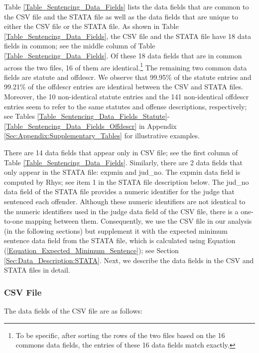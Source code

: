 \documentclass[11pt, oneside]{article}   	%
\theoremstyle{ModifiedStyle}
\begin{document}
  	Table \ref{Table_Sentencing_Data_Fields} lists the data fields that are common to the CSV file and the STATA file as well as the data fields that are unique to either the CSV file or the STATA file. As shown in Table \ref{Table_Sentencing_Data_Fields}, the CSV file and the STATA file have 18 data fields in common; see the middle column of Table \ref{Table_Sentencing_Data_Fields}. Of these 18 data fields that are in common across the two files, 16 of them are identical.\footnote{To be specific, after sorting the rows of the two files based on the 16 commons data fields, the entries of these 16 data fields match exactly.} The remaining two common data fields are statute and offdescr. We observe that 99.95\% of the statute entries and 99.21\% of the offdescr entries are identical between the CSV and STATA files. Moreover, the 10 non-identical statute entries and the 141 non-identical offdescr entries seem to refer to the same statutes and offense descriptions, respectively; see Tables \ref{Table_Sentencing_Data_Fields_Statute}-\ref{Table_Sentencing_Data_Fields_Offdescr} in Appendix \ref{Sec:Appendix:Supplementary_Tables} for illustrative examples.

  	There are 14 data fields that appear only in CSV file; see the first column of Table \ref{Table_Sentencing_Data_Fields}. Similarly, there are 2 data fields that only appear in the STATA file: expmin and jud\_no. The expmin data field is computed by Rhys; see item 1 in the STATA file description below. The jud\_no data field of the STATA file provides a numeric identifier for the judge that sentenced each offender. Although these numeric identifiers are not identical to the numeric identifiers used in the judge data field of the CSV file, there is a one-to-one mapping between them. Consequently, we use the CSV file in our analysis (in the following sections) but supplement it with the expected minimum sentence data field from the STATA file, which is calculated using Equation (\ref{Equation_Expected_Minimum_Sentence}); see Section \ref{Sec:Data_Description:STATA}. Next, we describe the data fields in the CSV and STATA files in detail.

  	\subsubsection{CSV File}
    	\label{Sec:Data_Description:CSV}
      The data fields of the CSV file are as follows:
\end{document}
